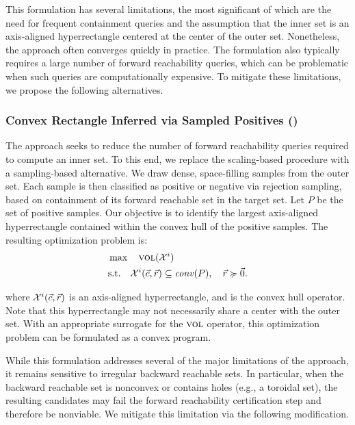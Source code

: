 \documentclass[letterpaper, 10 pt, conference]{ieeeconf}  %
\begin{document}
This formulation has several limitations, the most significant of which are the need for frequent containment queries and the assumption that the inner set is an axis-aligned hyperrectangle centered at the center of the outer set. Nonetheless, the approach often converges quickly in practice. The formulation also typically requires a large number of forward reachability queries, which can be problematic when such queries are computationally expensive. To mitigate these limitations, we propose the following alternatives.
\subsubsection{Convex Rectangle Inferred via Sampled Positives (\crisp)}
The \crisp approach seeks to reduce the number of forward reachability queries required to compute an inner set. To this end, we replace the scaling-based procedure with a sampling-based alternative. 
We draw dense, space-filling samples from the outer set. Each sample is then classified as positive or negative via rejection sampling, based on containment of its forward reachable set in the target set.
Let $P$ be the set of positive samples. Our objective is to identify the largest axis-aligned hyperrectangle contained within the convex hull of the positive samples.  The resulting optimization problem is:
\begin{subequations}
\begin{align}
&\max \quad \textsc{vol}(\mathcal{X}^i) \\
&\text{s.t.}\quad
\mathcal{X}^i(\vec{c},\vec{r}) \subseteq \mathit{conv}(P), \quad
\vec{r} \succcurlyeq \vec{0}.
\end{align}
\label{eq:bw_reach_crisp}
\end{subequations}

\vspace*{-1em}
\noindent
where $\mathcal{X}^i(\vec{c},\vec{r})$ is an axis-aligned hyperrectangle, and \conv is the convex hull operator. Note that this hyperrectangle may not necessarily share a center with the outer set. With an appropriate surrogate for the $\textsc{vol}$ operator, this optimization problem can be formulated as a convex program. 

While this formulation addresses several of the major limitations of the \ssharp approach, it remains sensitive to irregular backward reachable sets. In particular, when the backward reachable set is nonconvex or contains holes (e.g., a toroidal set), the resulting candidates may fail the forward reachability certification step and therefore be nonviable. We mitigate this limitation via the following modification.
\end{document}
